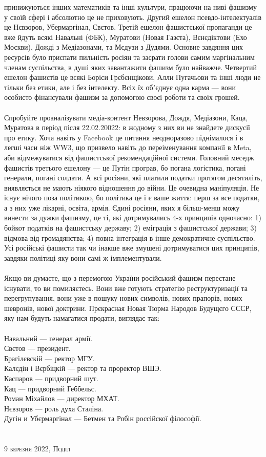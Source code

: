 принижуються інших математиків та інші культури, працюючи на ниві фашизму у
своїй сфері і абсолютно це не приховують. Другий ешелон псевдо-інтелектуалів
це Нєвзоров, Убермаргінал, Свєтов. Третій ешелон фашистської пропаганди це
вже йдуть всякі Навальні (ФБК), Муратови (Новая Газєта), Вєнєдіктови (Ехо Москви),
Дожді з Медіазонами, та Мєдузи з Дудями. Основне завдяння цих ресурсів було
приспати пильність росіян та засрати голови самим маргінальним членам суспільства,
в душі яких завантажити фашизм було найважче. Четвертий ешелон фашистів це всякі
Боріси Грєбєнщікови, Алли Пугачьови та інші люди не тільки без етики, але і без
інтелекту. Всіх їх обʼєднує одна карма --- вони особисто фінансували фашизм за
допомогою своєї роботи та своїх грошей.
\\
\\
Спробуйте проаналізувати медіа-контент Невзорова, Дождя, Медіазони, Каца, Муратова
в період після 22.02.20022: в жодному з них ви не знайдете дискусії про етику.
Хоча навіть у Facebook це питання неодноразово піднімалося і в легші часи ніж
WW3, що призвело навіть до переіменування компанії в Meta, аби відмежуватися
від фашистської рекомендаційної системи. Головний меседж фашистів третього
ешелону --- це Путін програв, бо погана логістика, погані генерали, погані
солдати. А всі росіяни, які платили податки протягом десятиліть, виявляється
не мають ніякого відношення до війни. Це очевидна маніпуляція. Не існує нічого
поза політикою, бо політика це і є ваше життя: перш за все податки, а з них
уже лікарні, освіта, армія. Єдині росіяни, яких я більш-менш можу винести за
дужки фашизму, це ті, які дотримувались 4-х принципів одночасно: 1) бойкот
податків на фашистську державу; 2) еміграція з фашистської держави; 3)
відмова від громадянства; 4) повна інтеграція в інше демократичне суспільство.
Усі російські фашисти так чи інакше вже змушені дотримуватися цих принципів,
завдяки політиці яку вони самі ж імплементували.
\\
\\
Якщо ви думаєте, що з перемогою України російський фашизм перестане існувати,
то ви помиляєтесь. Вони вже готують стратегію реструктуризації та перегрупування,
вони уже в пошуку нових символів, нових прапорів, нових шевронів, нової доктрини.
Прєкрасная Новая Тюрма Народов Будущєго СССР, яку нам будуть намагатися
продати, виглядає так:
\\
\\
Навальний --- генерал армії.\\
Свєтов --- президент.\\
Брагілєвскій --- ректор МГУ.\\
Калєдін і Вєрбіцкій --- ректор та проректор ВШЭ.\\
Каспаров --- придворний шут.\\
Кац --- придворний Геббельс.\\
Роман Міхайлов --- директор МХАТ.\\
Нєвзоров --- роль духа Сталіна.\\
Дугін и Убєрмаргінал --- Бетмен та Робін россійскої філософії.\\
\\
\\
\textsc{\footnotesize 9 березня 2022, Поділ}


